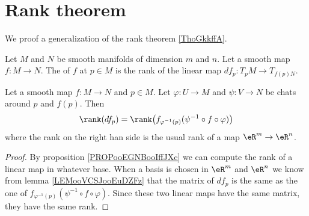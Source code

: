 \section{Rank theorem}

We proof a generalization of the rank theorem \ref{ThoGkkffA}.

\begin{definition}
	Let \( M\) and \( N\) be smooth manifolds of dimension \( m\) and \( n\). Let a smooth map \( f\colon M\to N\). The  of \( f\) at \( p\in M\) is the rank of the linear map \( df_p\colon T_pM\to T_{f(p)N}\).
\end{definition}

\begin{lemma}
	Let a smooth map \( f\colon M\to N\) and \( p\in M\). Let \( \varphi\colon U\to M\) and \( \psi\colon V\to N\) be chats around \( p\) and \( f(p)\). Then
	\begin{equation}
		\rank(df_p)=\rank\big( f_{\varphi^{-1}(p)}(\psi^{-1}\circ f\circ \varphi) \big)
	\end{equation}
	where the rank on the right han side is the usual rank of a map \( \eR^m\to \eR^n\).
\end{lemma}

\begin{proof}
	By proposition \ref{PROPooEGNBooIffJXc} we can compute the rank of a linear map in whatever base. When a basis is chosen in \( \eR^m\) and \( \eR^n\) we know from lemma \ref{LEMooVCSJooEuDZFz} that the matrix of \( df_p\) is the same as the one of \(  f_{\varphi^{-1}(p)}(\psi^{-1}\circ f\circ \varphi) \). Since these two linear maps have the same matrix, they have the same rank.
\end{proof}

